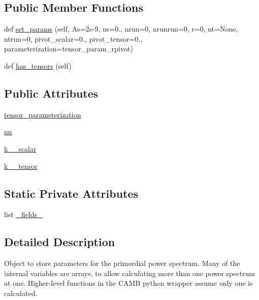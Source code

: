 \subsection*{Public Member Functions}
\begin{DoxyCompactItemize}
\item 
def \mbox{\hyperlink{classcamb_1_1initialpower_1_1InitialPowerParams_acd73daab89bb1c79e52dfd5764ff3c91}{set\+\_\+params}} (self, As=2e-\/9, ns=0., nrun=0, nrunrun=0, r=0, nt=\+None, ntrun=0, pivot\+\_\+scalar=0., pivot\+\_\+tensor=0., parameterization=tensor\+\_\+param\+\_\+rpivot)
\item 
def \mbox{\hyperlink{classcamb_1_1initialpower_1_1InitialPowerParams_a7b52a848ef6cbc2f6c7ce910571d0813}{has\+\_\+tensors}} (self)
\end{DoxyCompactItemize}
\subsection*{Public Attributes}
\begin{DoxyCompactItemize}
\item 
\mbox{\hyperlink{classcamb_1_1initialpower_1_1InitialPowerParams_afd4cd465faad5f538b9e45a0e0e22515}{tensor\+\_\+parameterization}}
\item 
\mbox{\hyperlink{classcamb_1_1initialpower_1_1InitialPowerParams_a15b26e7b97622d32e2f302bea45566a0}{nn}}
\item 
\mbox{\hyperlink{classcamb_1_1initialpower_1_1InitialPowerParams_ac3fbb18abfbd776bbd1c6f787d72af31}{k\+\_\+\_\+scalar}}
\item 
\mbox{\hyperlink{classcamb_1_1initialpower_1_1InitialPowerParams_a9a9e09ac537ae5a70ceadcf83ba5febe}{k\+\_\+\_\+tensor}}
\end{DoxyCompactItemize}
\subsection*{Static Private Attributes}
\begin{DoxyCompactItemize}
\item 
list \mbox{\hyperlink{classcamb_1_1initialpower_1_1InitialPowerParams_aed3d8d753d0648c63a0db198188dd64a}{\+\_\+fields\+\_\+}}
\end{DoxyCompactItemize}


\subsection{Detailed Description}
\begin{DoxyVerb}Object to store parameters for the primordial power spectrum.
Many of the internal variables are arrays, to allow calculating more than one power spectrum at one. Higher-level functions in the
CAMB python wrapper assume only one is calculated.\end{DoxyVerb}
 


